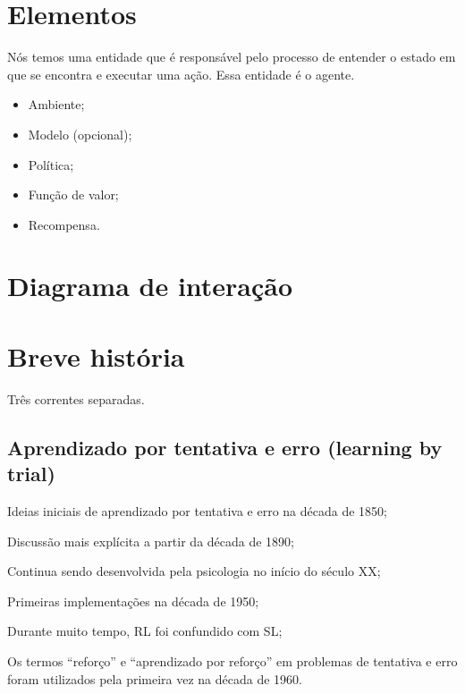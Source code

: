 \documentclass{article}
\begin{document}
    \section{Elementos}
    
        Nós temos uma entidade que é responsável pelo processo de entender o estado em que se encontra e executar uma ação. Essa entidade é o agente. 
    
        \begin{itemize}
            \item Ambiente;
            \item Modelo (opcional);
            \item Política;
            \item Função de valor;
            \item Recompensa.
        \end{itemize}
        
    \section{Diagrama de interação}
    
        \begin{center}
            \rlinteraction
        \end{center}
    
    \section{Breve história}
    
        Três correntes separadas.
        
        \subsection{Aprendizado por tentativa e erro (learning by trial)}
            Ideias iniciais de aprendizado por tentativa e erro na década de 1850;
            
            Discussão mais explícita a partir da década de 1890;
            
            Continua sendo desenvolvida pela psicologia no início do século XX;
            
            Primeiras implementações na década de 1950;
            
            Durante muito tempo, RL foi confundido com SL;
            
            Os termos “reforço” e “aprendizado por reforço” em problemas de tentativa e erro foram utilizados pela primeira vez na década de 1960.
    
\end{document}
